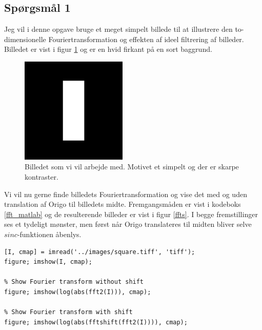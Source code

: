 \documentclass[a4paper, 10pt, danish, final]{article}
\title{\mytitle}
\subtitle{\mysubtitle}
\author{\myauthor{} - \mymail}
\date{\mydate}
\begin{document}
\maketitle

\subsection*{Spørgsmål 1}
Jeg vil i denne opgave bruge et meget simpelt billede til at illustrere
den to-dimensionelle Fouriertransformation og effekten af ideel
filtrering af billeder. Billedet er vist i figur \ref{square} og er en
hvid firkant på en sort baggrund.

\begin{figure}[!h]
    \centering
    \includegraphics[angle=0,width=0.45\textwidth]{images/square}
    \caption[]{Billedet som vi vil arbejde med. Motivet et simpelt og
    der er skarpe kontraster.}
    \label{square}
\end{figure}

Vi vil nu gerne finde billedets Fouriertransformation og vise det med og
uden translation af Origo til billedets midte. Fremgangsmåden er vist i
kodeboks \ref{fft_matlab} og de resulterende billeder er vist i figur
\ref{ffts}. I begge fremstillinger ses et tydeligt mønster, men først
når Origo translateres til midten bliver selve $sinc$-funktionen
åbenlys.

\begin{lstlisting}[caption={Fouriertransformation i MATLAB},
    captionpos=b, label={fft_matlab}, float=t, numbers=none]
% Read and show the original image
[I, cmap] = imread('../images/square.tiff', 'tiff');
figure; imshow(I, cmap);

% Show Fourier transform without shift
figure; imshow(log(abs(fft2(I))), cmap);

% Show Fourier transform with shift
figure; imshow(log(abs(fftshift(fft2(I)))), cmap);
\end{lstlisting}
\end{document}
